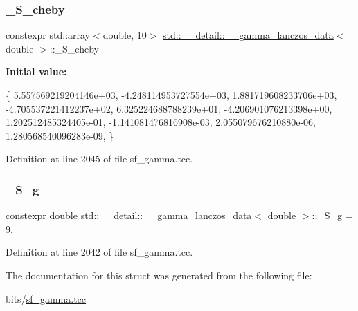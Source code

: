 \subsubsection{\texorpdfstring{\+\_\+\+S\+\_\+cheby}{\_S\_cheby}}
{\footnotesize\ttfamily constexpr std\+::array$<$double, 10$>$ \hyperlink{structstd_1_1____detail_1_1____gamma__lanczos__data}{std\+::\+\_\+\+\_\+detail\+::\+\_\+\+\_\+gamma\+\_\+lanczos\+\_\+data}$<$ double $>$\+::\+\_\+\+S\+\_\+cheby\hspace{0.3cm}{\ttfamily [static]}}

{\bfseries Initial value\+:}
\begin{DoxyCode}
\{
     5.557569219204146e+03,
    -4.248114953727554e+03,
     1.881719608233706e+03,
    -4.705537221412237e+02,
     6.325224688788239e+01,
    -4.206901076213398e+00,
     1.202512485324405e-01,
    -1.141081476816908e-03,
     2.055079676210880e-06,
     1.280568540096283e-09,
      \}
\end{DoxyCode}


Definition at line 2045 of file sf\+\_\+gamma.\+tcc.

\mbox{\label{structstd_1_1____detail_1_1____gamma__lanczos__data_3_01double_01_4_ab7959ed84fcc00db67df8b167165513d}} 
\subsubsection{\texorpdfstring{\+\_\+\+S\+\_\+g}{\_S\_g}}
{\footnotesize\ttfamily constexpr double \hyperlink{structstd_1_1____detail_1_1____gamma__lanczos__data}{std\+::\+\_\+\+\_\+detail\+::\+\_\+\+\_\+gamma\+\_\+lanczos\+\_\+data}$<$ double $>$\+::\+\_\+\+S\+\_\+g = 9.\hspace{0.3cm}{\ttfamily [static]}}



Definition at line 2042 of file sf\+\_\+gamma.\+tcc.



The documentation for this struct was generated from the following file\+:\begin{DoxyCompactItemize}
\item 
bits/\hyperlink{sf__gamma_8tcc}{sf\+\_\+gamma.\+tcc}\end{DoxyCompactItemize}
